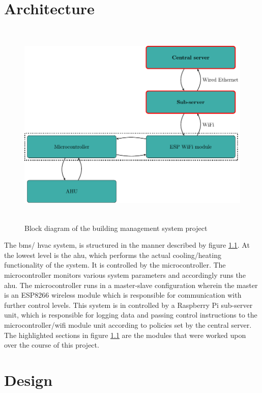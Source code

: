 \documentclass[letterpaper,11pt]{report}
\begin{document}
\newpage
\chapter{Architecture}\label{chapter:architecture}
\onehalfspacing
\begin{figure}[h]
\includegraphics[width=14cm, height=10cm]{arch}
\centering
\captionsetup{justification=centering}
\caption{Block diagram of the building management system project}
\label{fig:arch}
\end{figure}
The \ac{bms}/ \ac{hvac} system, is structured in the manner described by figure \ref{fig:arch}. At the lowest level is the \ac{ahu}, which performs the actual cooling/heating functionality of the system. It is controlled by the microcontroller. The microcontroller monitors various system parameters and accordingly runs the \ac{ahu}. The microcontroller runs in a master-slave configuration wherein the master is an ESP8266 wireless module which is responsible for communication with further control levels. This system is in controlled by a Raspberry Pi sub-server unit, which is responsible for logging data and passing control instructions to the microcontroller/wifi module unit according to policies set by the central server. The highlighted sections in figure \ref{fig:arch} are the modules that were worked upon over the course of this project.

\newpage
\chapter{Design}\label{chapter:Design}
\onehalfspacing
\end{document}
